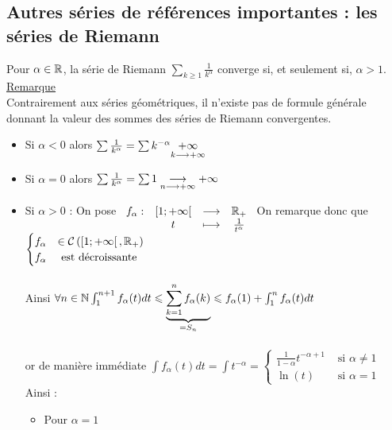 \subsection{Autres séries de références importantes : les séries de Riemann}
\begin{defprop}
   Pour \(\alpha  \in  \mathbb{R}\), la série de Riemann \(\sum_{k\geq 1} \frac{1}{k^{\alpha}}\)  converge si, et seulement si, \(\alpha  > 1\).\\
    \underline{Remarque}\\
    Contrairement aux séries géométriques, il n’existe pas de formule générale donnant la valeur des sommes des séries de Riemann convergentes. 
\end{defprop}

\begin{dem}
    \begin{itemize}
        \item Si \(\alpha < 0\) alors \(\sum \frac{1}{k^{\alpha}} = \sum k^{-\alpha} \underset{k \longrightarrow +\infty}{+\infty}\)
        \item Si \(\alpha = 0\) alors \(\sum \frac{1}{k^{\alpha}} = \sum 1 \underset{n \longrightarrow +\infty}{\longrightarrow} +\infty \)
        \item Si \(\alpha >0\) :
            On pose \(\begin{array}[t]{cccc}f_{\alpha} : & \left[1;+\infty\right[ & \longrightarrow & \mathbb{R}_+ \\ & t & \longmapsto & \frac{1}{t^{\alpha}}\end{array}\) On remarque donc que \(\begin{cases}
                f_{\alpha} &\in \mathcal{C}\left(\left[1;+\infty\right[,\mathbb{R}_+\right)\\
                f_{\alpha} &\text{ est décroissante}
            \end{cases}\)\\~\\
            Ainsi \(\forall n \in \mathbb{N} \int_{1}^{n+1}f_{\alpha}(t)dt\leqslant \underbrace{ \sum_{k=1}^n f_{\alpha}(k)}_{ = S_n} \leqslant f_{\alpha}(1) + \int_{1}^n f_{\alpha}(t)dt\)\\~\\
            or de manière immédiate \(\int f_{\alpha}(t)dt = \int t^{-\alpha} = \begin{cases}
                \frac{1}{1-\alpha}t^{-\alpha +1} &\text{ si } \alpha \neq 1\\
                \ln(t) &\text{ si } \alpha = 1 
            \end{cases}\)
            Ainsi :
            \begin{itemize}
                \item Pour \(\alpha = 1\)\\~\\

\end{itemize}
\end{itemize}
\end{dem}
